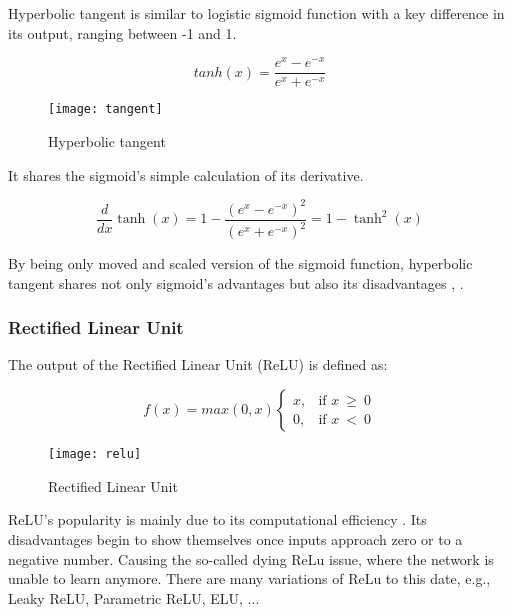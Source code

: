 Hyperbolic tangent is similar to logistic sigmoid function with a key difference in its output, ranging between -1 and 1.

\begin{equation}
    {tanh(x) = \frac{e^x - e^{-x}}{e^x + e^{-x}}}
\end{equation}


\begin{figure}[h]
    \centering
    \texttt{[image: tangent]}
    \caption{Hyperbolic tangent \cite{matous}}
    \label{fig:hyperbolictangent}
\end{figure}


It shares the sigmoid's simple calculation of its derivative.

\begin{equation}
    {\frac{d}{dx}\tanh(x) = 1 - \frac{(e^x - e^{-x})^2}{(e^x + e^{-x})^2} = 1 -\tanh^2(x)}
\end{equation}

By being only moved and scaled version of the sigmoid function, hyperbolic tangent shares not only sigmoid's advantages but also its disadvantages \cite{leskovec2020mining}, \cite{matous}.


\subsubsection{Rectified Linear Unit}

The output of the Rectified Linear Unit (ReLU) is defined as:

\begin{equation}
    f(x) = max(0,x)
\begin{cases}
    x, & \text{if $x\ \geq\ 0$}\\
    0, & \text{if $x\ <\ 0$}
\end{cases} 
\end{equation} 

\begin{figure}[h]
    \centering
    \texttt{[image: relu]}
    \caption{Rectified Linear Unit \cite{matous}}
    \label{fig:relu}
\end{figure}


ReLU's popularity is mainly due to its computational efficiency \cite{7typesactivationfunctions}. Its disadvantages begin to show themselves once inputs approach zero or to a negative number. Causing the so-called dying ReLu issue, where the network is unable to learn anymore. There are many variations of ReLu to this date, e.g., Leaky ReLU, Parametric ReLU, ELU, ...

